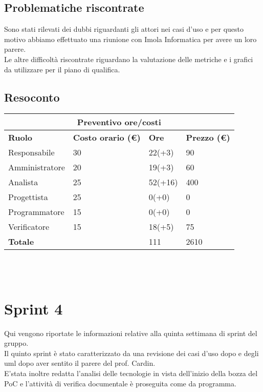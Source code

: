 \documentclass[12pt]{article}
\begin{document}
\subsection{Problematiche riscontrate}
Sono stati rilevati dei dubbi riguardanti gli attori nei casi d'uso e per questo motivo abbiamo effettuato una riunione con Imola Informatica per avere un loro parere.\\
Le altre difficoltà riscontrate riguardano la valutazione delle metriche e i grafici da utilizzare per il piano di qualifica.
\subsection{Resoconto}
\begin{center}
    \begin{tabularx}{\textwidth}{|X|X|X|X|}
        \hline
        \multicolumn{4}{|c|}{\textbf{Preventivo ore/costi}}\\
        \hline
        \hline
        \textbf{Ruolo} & \textbf{Costo orario (\euro)} & \textbf{Ore} & \textbf{Prezzo (\euro)}\\
        \hline
        Responsabile    & 30 & 22(+3)  & 90\\
        \hline
        Amministratore  & 20 & 19(+3)  & 60\\
        \hline
        Analista        & 25 & 52(+16)  & 400\\
        \hline
        Progettista     & 25 & 0(+0)  & 0\\
        \hline
        Programmatore   & 15 & 0(+0)  & 0\\
        \hline
        Verificatore    & 15 & 18(+5)  & 75\\
        \hline
        \hline
        \textbf{Totale} &    & 111 &  2610 \\
        \hline
    \end{tabularx}\\[8pt]
    \mbox{}\\
\end{center}

\section{Sprint 4}
Qui vengono riportate le informazioni relative alla quinta settimana di sprint del gruppo. \\
Il quinto sprint è stato caratterizzato da una revisione dei casi d'uso dopo e degli uml dopo aver sentito il parere del prof. Cardin.\\
E'stata inoltre redatta l'analisi delle tecnologie in vista dell'inizio della bozza del PoC e l'attività di verifica documentale è proseguita come da programma.
\end{document}
